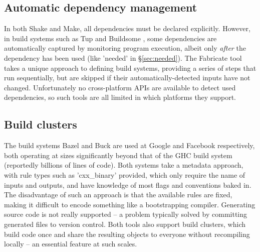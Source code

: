 \subsection{Automatic dependency management}

In both Shake and Make, all dependencies must be declared explicitly. However, in build systems such as Tup \cite{tup} and Buildsome \cite{buildsome}, some dependencies are automatically captured by monitoring program execution, albeit only \emph{after} the dependency has been used (like \lst'needed' in \S\ref{sec:needed}). The Fabricate tool \cite{fabricate} takes a unique approach to defining build systems, providing a series of steps that run sequentially, but are skipped if their automatically-detected inputs have not changed. Unfortunately no cross-platform APIs are available to detect used dependencies, so such tools are all limited in which platforms they support.

\subsection{Build clusters}

The build systems Bazel and Buck \cite{buck} are used at Google and Facebook respectively, both operating at sizes significantly beyond that of the GHC build system (reportedly billions of lines of code). Both systems take a metadata approach, with rule types such as \lst'cxx_binary' provided, which only require the name of inputs and outputs, and have knowledge of most flags and conventions baked in. The disadvantage of such an approach is that the available rules are fixed, making it difficult to encode something like a bootstrapping compiler. Generating source code is not really supported -- a problem typically solved by committing generated files to version control. Both tools also support build clusters, which build code once and share the resulting objects to everyone without recompiling locally -- an essential feature at such scales.
